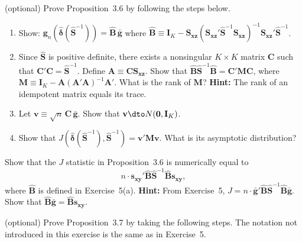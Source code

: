 \begin{problemset}
\exercise[5]
(optional) Prove Proposition~3.6 by following the steps below.

\begin{enumerate}[label=(\alph*)]
\item Show: $\mathbf{g}_n(\hat{\boldsymbol{\delta}}(\hat{\mathbf{S}}^{-1}))
  = \hat{\mathbf{B}}\, \bar{\mathbf{g}}$ where
  $\hat{\mathbf{B}} \equiv \mathbf{I}_K
  - \mathbf{S}_{\mathbf{xz}}(\mathbf{S}_{\mathbf{xz}}'
  \hat{\mathbf{S}}^{-1} \mathbf{S}_{\mathbf{xz}})^{-1}
  \mathbf{S}_{\mathbf{xz}}' \hat{\mathbf{S}}^{-1}$.

\item Since $\hat{\mathbf{S}}$ is positive definite, there exists a nonsingular $K \times K$ matrix
  $\mathbf{C}$ such that $\mathbf{C}'\mathbf{C} = \hat{\mathbf{S}}^{-1}$.  Define
  $\mathbf{A} \equiv \mathbf{C}\mathbf{S}_{\mathbf{xz}}$.  Show that
  $\hat{\mathbf{B}}\hat{\mathbf{S}}^{-1}\hat{\mathbf{B}} = \mathbf{C}'\mathbf{M}\mathbf{C}$,
  where $\mathbf{M} \equiv \mathbf{I}_K - \mathbf{A}(\mathbf{A}'\mathbf{A})^{-1}\mathbf{A}'$.
  What is the rank of $\mathbf{M}$?  \textbf{Hint:} The rank of an idempotent matrix equals its trace.

\item Let $\mathbf{v} \equiv \sqrt{n}\, \mathbf{C}\, \bar{\mathbf{g}}$.
  Show that $\mathbf{v} \dto N(\mathbf{0}, \mathbf{I}_K)$.

\item Show that $J(\hat{\boldsymbol{\delta}}(\hat{\mathbf{S}}^{-1}), \hat{\mathbf{S}}^{-1})
  = \mathbf{v}'\mathbf{M}\mathbf{v}$.  What is its asymptotic distribution?
\end{enumerate}

\exercise[6]
Show that the $J$ statistic in Proposition~3.6 is numerically equal to
\[
  n \cdot \mathbf{s}_{\mathbf{xy}}' \hat{\mathbf{B}} \hat{\mathbf{S}}^{-1}
  \hat{\mathbf{B}} \mathbf{s}_{\mathbf{xy}},
\]
where $\hat{\mathbf{B}}$ is defined in Exercise~5(a).  \textbf{Hint:} From Exercise~5,
$J = n \cdot \bar{\mathbf{g}}' \hat{\mathbf{B}} \hat{\mathbf{S}}^{-1} \hat{\mathbf{B}} \bar{\mathbf{g}}$.
Show that $\hat{\mathbf{B}} \bar{\mathbf{g}} = \hat{\mathbf{B}} \mathbf{s}_{\mathbf{xy}}$.

\exercise[7]
(optional) Prove Proposition~3.7 by taking the following steps.  The notation
not introduced in this exercise is the same as in Exercise~5.


\end{problemset}
